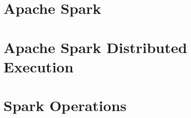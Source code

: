 \section{Apache Spark}\label{sec:apache-spark}


\section{Apache Spark Distributed Execution}\label{sec:apache-spark-distributed-execution}


\section{Spark Operations}\label{sec:spark-operations}


